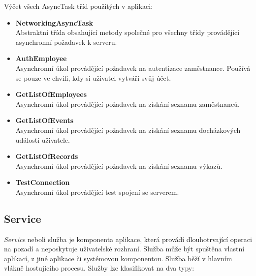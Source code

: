 \documentclass{diplomka}
\begin{document}
Výčet všech AsyncTask tříd použitých v aplikaci:
\begin{itemize}[noitemsep,nolistsep]
\item \textbf{NetworkingAsyncTask}\\
Abstraktní třída obsahující metody společné pro všechny třídy provádějící asynchronní požadavek k serveru.
\item \textbf{AuthEmployee}\\
Asynchronní úkol provádějící požadavek na autentizace zaměstnance. Používá se pouze ve chvíli, kdy si uživatel vytváří svůj účet.
\item \textbf{GetListOfEmployees}\\
Asynchronní úkol provádějící požadavek na získání seznamu zaměstnanců.
\item \textbf{GetListOfEvents}\\
Asynchronní úkol provádějící požadavek na získání seznamu docházkových událostí uživatele.
\item \textbf{GetListOfRecords}\\
Asynchronní úkol provádějící požadavek na získání seznamu výkazů.
\item \textbf{TestConnection}\\
Asynchronní úkol provádějící test spojení se serverem.
\end{itemize}

\subsection{Service}
\emph{Service} neboli služba je komponenta aplikace, která provádí dlouhotrvající operaci na pozadí a neposkytuje uživatelské rozhraní. Služba může být spuštěna vlastní aplikací, z jiné aplikace či systémovou komponentou.  Služba běží v hlavním vlákně hostujícího procesu. Služby lze klasifikovat na dva typy:
\end{document}
